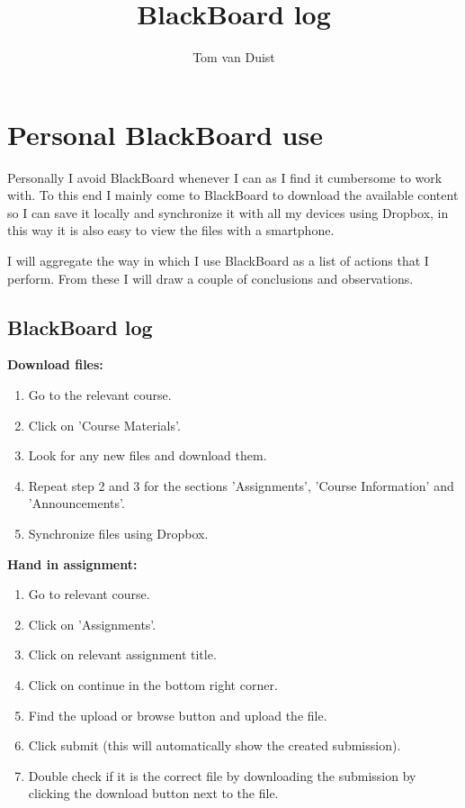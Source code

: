 

\title{BlackBoard log}
\what{}
\supervisors{}
\author{Tom van Duist}




\maketitle



\clearpage

\chapter{Personal BlackBoard use}
Personally I avoid BlackBoard whenever I can as I find it cumbersome to work with. To this end I mainly come to BlackBoard to download the available content so I can save it locally and synchronize it with all my devices using Dropbox, in this way it is also easy to view the files with a smartphone.

I will aggregate the way in which I use BlackBoard as a list of actions that I perform. From these I will draw a couple of conclusions and observations.


\section{BlackBoard log}

\textbf{Download files:}
\begin{enumerate}
	\item Go to the relevant course.
	\item Click on 'Course Materials'.
	\item Look for any new files and download them.
	\item Repeat step 2 and 3 for the sections 'Assignments', 'Course Information' and 'Announcements'.
	\item Synchronize files using Dropbox.
\end{enumerate}

\textbf{Hand in assignment:}
\begin{enumerate}
	\item Go to relevant course.
	\item Click on 'Assignments'.
	\item Click on relevant assignment title.
	\item Click on continue in the bottom right corner.
	\item Find the upload or browse button and upload the file.
	\item Click submit (this will automatically show the created submission).
	\item Double check if it is the correct file by downloading the submission by clicking the download button next to the file.
\end{enumerate}


